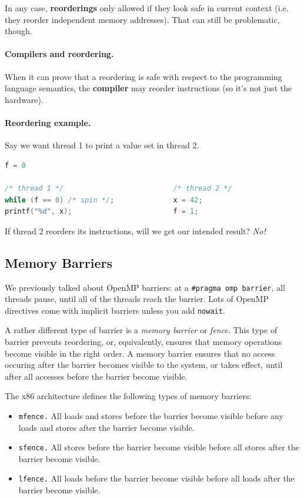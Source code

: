 \documentclass[a4paper]{report}
\begin{document}
In any case, {\bf reorderings} only allowed if they look safe in
current context (i.e. they reorder independent memory addresses).
That can still be problematic, though.

\paragraph{Compilers and reordering.}
When it can prove that a reordering is safe with respect to the
programming language semantics, the {\bf compiler} may reorder instructions (so it's not just the hardware).

\paragraph{Reordering example.} Say we want thread 1 to print a value set in thread 2.
  \begin{lstlisting}[language=C]
                            f = 0

/* thread 1 */                          /* thread 2 */
while (f == 0) /* spin */;              x = 42;
printf("%d", x);                        f = 1;
  \end{lstlisting}

If thread 2 reorders its instructions, will we get our intended
result? \emph{No!}

\subsection*{Memory Barriers} We previously talked about OpenMP barriers: 
at a {\tt \#pragma omp barrier}, all threads pause, until all of the
threads reach the barrier. Lots of OpenMP directives come with implicit barriers
unless you add {\tt nowait}.

A rather different type of barrier is a \emph{memory barrier} or
\emph{fence}. This type of barrier prevents reordering, or,
equivalently, ensures that memory operations become visible in the
right order. A memory barrier ensures that no access occuring after
the barrier becomes visible to the system, or takes effect, until
after all accesses before the barrier become visible.


The x86 architecture defines the following types of memory 
barriers:

\begin{itemize}
\item {\tt mfence.} All loads and stores before the barrier become
visible before any loads and stores after the barrier become visible.
\item {\tt sfence.} All stores before the barrier become visible before
all stores after the barrier become visible.
\item {\tt lfence.} All loads before the barrier become visible before
all loads after the barrier become visible.
\end{itemize}
\end{document}
